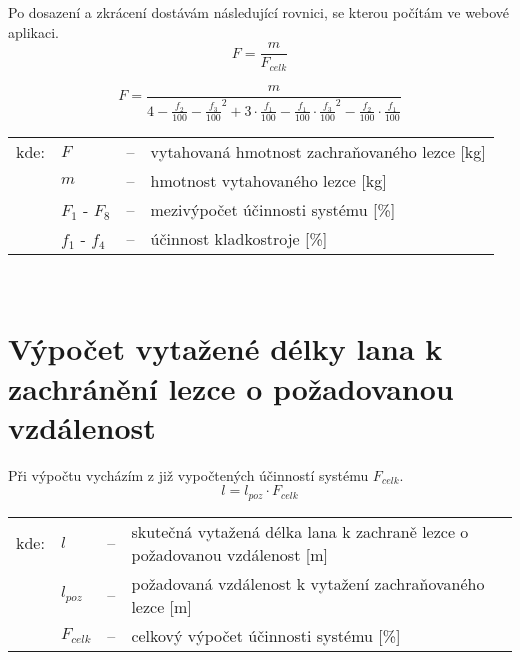 \noindent Po dosazení a zkrácení dostávám následující rovnici, se kterou počítám ve webové aplikaci.
\begin{equation}
    \label{eqn:9_calculation_7_1}
    F = \frac{m}{F_{celk}}
\end{equation}

\begin{equation}
    \label{eqn:10_calculation_7_1}
    F = \frac{m}{4 - \frac{f_2}{100} - \frac{f_3}{100}^{2} + 3 \cdot \frac{f_1}{100} - \frac{f_1}{100} \cdot \frac{f_3}{100}^{2} - \frac{f_2}{100} \cdot \frac{f_1}{100}}
\end{equation}

\begin{tabular}{l l c p{9.75cm}}
    kde: \hspace{0.25cm} & $F$ & -- & vytahovaná hmotnost zachraňovaného lezce [kg]\\
    \hspace{0.25cm} & $m$ & -- & hmotnost vytahovaného lezce [kg]\\
    \hspace{0.25cm} & $F_1$ - $F_8$ & -- & mezivýpočet účinnosti systému [\%]\\
    \hspace{0.25cm} & $f_1$ - $f_4$ & -- & účinnost kladkostroje [\%]\\
\end{tabular}
\\
\section{Výpočet vytažené délky lana k zachránění lezce o požadovanou vzdálenost}
Při výpočtu vycházím z již vypočtených účinností systému $F_{celk}$.
\begin{equation}
    \label{eqn:calculation_distance}
    l = l_{poz} \cdot F_{celk}
\end{equation}

\begin{tabular}{l l c p{9.75cm}}
    kde: \hspace{0.25cm} & $l$ & -- & skutečná vytažená délka lana k zachraně lezce o požadovanou vzdálenost [m]\\
    \hspace{0.25cm} & $l_{poz}$ & -- & požadovaná vzdálenost k vytažení zachraňovaného lezce [m]\\
    \hspace{0.25cm} & $F_{celk}$ & -- & celkový výpočet účinnosti systému [\%]\\
\end{tabular}